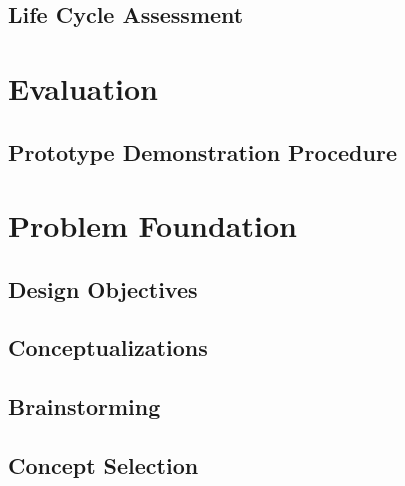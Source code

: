 \documentclass{article}
\begin{document}
\subsection{Life Cycle Assessment}








\section{Evaluation}
\subsection{Prototype Demonstration Procedure}


\appendix

\section{Problem Foundation}
\subsection{Design Objectives}


\subsection{Conceptualizations}

\subsection{Brainstorming}

\subsection{Concept Selection}

\end{document}
